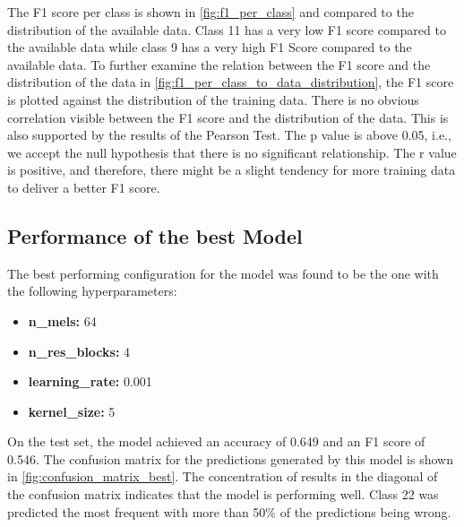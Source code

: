 The F1 score per class is shown in \autoref{fig:f1_per_class} and compared to the distribution
of the available data. Class 11 has a very low F1 score compared to the available data while class 9 has a very high F1 Score
compared to the available data. To further examine the relation between the F1 score and the distribution of the data
in \autoref{fig:f1_per_class_to_data_distribution}, the F1 score is plotted against the distribution of the training data.
There is no obvious correlation visible between the F1 score and the distribution of the data. This is also supported by the results
of the Pearson Test. The p value is above 0.05, i.e., we accept the null hypothesis that there is no significant relationship. The r value
is positive, and therefore, there might be a slight tendency for more training data to deliver a better F1 score.










\subsection{Performance of the best Model}%

The best performing configuration for the model was found to be the one with the following hyperparameters:

\begin{itemize}
    \item \textbf{n\_mels:} 64
    \item \textbf{n\_res\_blocks:} 4
    \item \textbf{learning\_rate:} 0.001
    \item \textbf{kernel\_size:} 5
\end{itemize}

On the test set, the model achieved an accuracy of 0.649 and an F1 score of 0.546. 
The confusion matrix for the predictions generated by this model is shown in \autoref{fig:confusion_matrix_best}.
The concentration of results in the diagonal of the confusion matrix indicates that the model is performing well.
Class 22 was predicted the most frequent with more than 50\% of the predictions being wrong.


